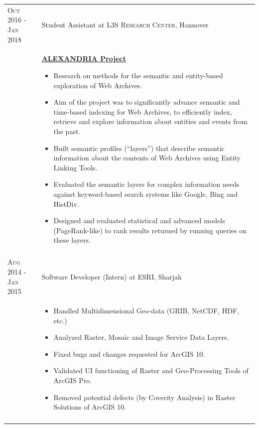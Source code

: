 \documentclass[a4paper,10pt]{article} %
\begin{document}
\begin{longtable}{l p{11cm}}

\textsc{Oct 2016 - Jan 2018} & Student Assistant at \textsc{L3S Research Center}, Hannover\\[1mm]
& \textbf{\footnotesize{\href{http://alexandria-project.eu/}{ALEXANDRIA Project}}}\vspace{0.2em}
  {\footnotesize
  	\begin{itemize}
  		\setlength\itemsep{0.2em}
 		\item Research on methods for the semantic and entity-based exploration of Web Archives. 
 		\item Aim of the project was to significantly advance semantic and time-based indexing for Web Archives, to efficiently index, retrieve and explore information about entities and events from the past.
		\item Built semantic profiles (“layers”) that describe semantic information about the
		contents of Web Archives using Entity Linking Tools.
		\item Evaluated the semantic layers for complex information needs against keyword-based search
systems like Google, Bing and HistDiv.
		\item Designed and evaluated statistical and advanced models (PageRank-like) to
		rank results returned by running queries on these layers.    
  \end{itemize}
  }\\
 \multicolumn{2}{c}{} \\[-1.5em]


\textsc{Aug 2014 - Jan 2015} & Software Developer (Intern) at \textsc{ESRI}, Sharjah\\[-1em]
& {\footnotesize
  	\begin{itemize}
  		\setlength\itemsep{0.2em}
 		\item Handled Multidimensional Geo-data (GRIB, NetCDF, HDF, etc.)
		\item Analyzed Raster, Mosaic and Image Service Data Layers.
 		\item Fixed bugs and changes requested for ArcGIS 10.
		\item Validated UI functioning of Raster and Geo-Processing Tools of ArcGIS Pro.
		\item Removed potential defects (by Coverity Analysis) in Raster Solutions of ArcGIS 10.    
  \end{itemize}
  }\\
\multicolumn{2}{c}{} \\

\end{longtable} 
\vspace{-1.5em}
\end{document}

